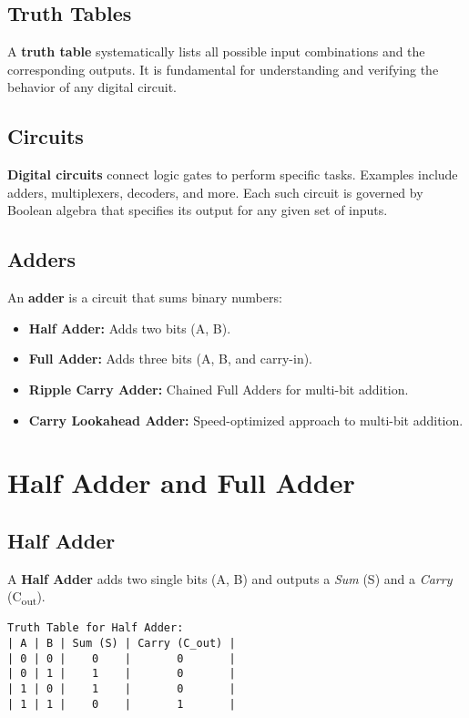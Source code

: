 \documentclass[12pt]{article}
\begin{document}
\subsection{Truth Tables}
A \textbf{truth table} systematically lists all possible input combinations and the corresponding outputs. It is fundamental for understanding and verifying the behavior of any digital circuit.

\subsection{Circuits}
\textbf{Digital circuits} connect logic gates to perform specific tasks. Examples include adders, multiplexers, decoders, and more. Each such circuit is governed by Boolean algebra that specifies its output for any given set of inputs.

\subsection{Adders}
An \textbf{adder} is a circuit that sums binary numbers:
\begin{itemize}
  \item \textbf{Half Adder:} Adds two bits (A, B).
  \item \textbf{Full Adder:} Adds three bits (A, B, and carry-in).
  \item \textbf{Ripple Carry Adder:} Chained Full Adders for multi-bit addition.
  \item \textbf{Carry Lookahead Adder:} Speed-optimized approach to multi-bit addition.
\end{itemize}

\section{Half Adder and Full Adder}

\subsection{Half Adder}
A \textbf{Half Adder} adds two single bits (A, B) and outputs a \textit{Sum} (S) and a \textit{Carry} (C\textsubscript{out}).

\begin{verbatim}
Truth Table for Half Adder:
| A | B | Sum (S) | Carry (C_out) |
| 0 | 0 |    0    |       0       |
| 0 | 1 |    1    |       0       |
| 1 | 0 |    1    |       0       |
| 1 | 1 |    0    |       1       |
\end{verbatim}
\end{document}
